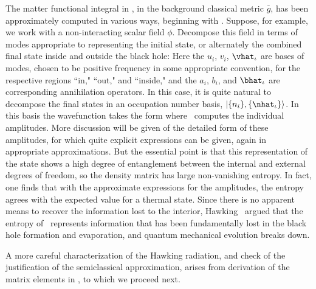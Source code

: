 The matter functional integral in \approxint, in the background classical metric $\bar g$, has been approximately computed in various ways, beginning with \Hawkevap.  Suppose, for example, we work with a non-interacting scalar field $\phi$.  Decompose this field in terms of modes appropriate to representing the initial state, or alternately the combined final state inside and outside the black hole:
%
\eqn{}
%
Here the $u_i$, $v_i$, $\vhat_\iota$ are bases of modes, chosen to be positive frequency in some appropriate convention, for the respective regions ``in," ``out," and ``inside," and the $a_i$, $b_i$, and $\bhat_\iota$ are corresponding annihilation operators.  In this case, it is quite natural to decompose the final states in an occupation number basis, $|\{n_i\},\{\nhat_\iota\}\rangle$.  In this basis the wavefunction takes the form
%
\eqn{}
%
where \approxint\ computes the individual amplitudes.  More discussion will be given of the detailed form of these amplitudes, for which quite explicit expressions can be given, again in appropriate approximations.  But the essential point is that this representation of the state shows a high degree of entanglement between the internal and external degrees of freedom, so the density matrix
%
\eqn{}
%
has large non-vanishing entropy.  In fact, one finds that with the approximate expressions for the amplitudes, the entropy agrees with the expected value for a thermal state.  Since there is no apparent means to recover the information lost to the interior, Hawking \Hawkunc\ argued that the entropy of \densocc\ represents information that has been fundamentally lost in the black hole formation and evaporation, and quantum mechanical evolution breaks down.



A more careful characterization of the Hawking radiation, and check of the justification of the semiclassical approximation, arises from derivation of the matrix elements in \psiapprox, to which we proceed next.




